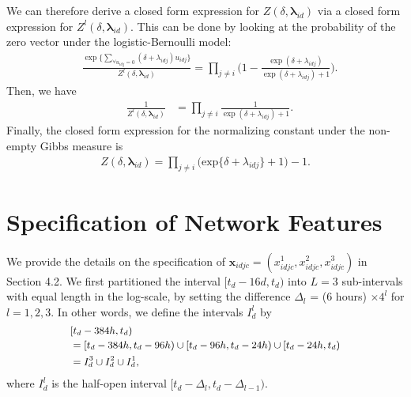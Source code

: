 \documentclass{article}
\begin{document}
 	 We can therefore derive a closed form expression for $Z(\delta,\boldsymbol{\lambda}_{id})$ via a closed form expression for $Z^{l}(\delta,\boldsymbol{\lambda}_{id})$. This can be done by looking at the probability of the zero vector under the logistic-Bernoulli model:
 	 \begin{equation*}
 	 	\begin{aligned}
 	 		&\frac{\exp\Big\{ \sum\limits_{\forall u_{idj}=0}(\delta+\lambda_{idj})u_{idj} \Big\}}{Z^{l}(\delta,\boldsymbol{\lambda}_{id})}= \prod_{j \neq i}   \Big(1-\frac{ \exp{(\delta+\lambda_{idj})}}{\exp{(\delta+\lambda_{idj})} + 1}\Big).
 	 	\end{aligned}  
 	 \end{equation*}
 	 Then, we have 
 	 \begin{equation*}
 	 	\begin{aligned}
 	 		& \frac{1}{Z^{l}(\delta,\boldsymbol{\lambda}_{id})} &= \prod\limits_{j \neq i}\frac{1}{ \exp(\delta+\lambda_{idj})+ 1}.
 	 	\end{aligned}  
 	 \end{equation*}
 	 Finally, the closed form expression for the normalizing constant under the non-empty Gibbs measure is  \begin{equation*}
 	 	\begin{aligned}Z(\delta,\boldsymbol{\lambda}_{id}) = \prod_{j \neq i } \big(\mbox{exp}\{\delta+\lambda_{idj}\} + 1\big)-1.
 	 	\end{aligned}  
 	 \end{equation*}

 \section{Specification of Network Features}\label{sec:Specification of Network Features}
We provide the details on the specification of $\boldsymbol{x}_{idjc} = ({x}^1_{idjc}, {x}^2_{idjc}, {x}^3_{idjc})$ in Section 4.2. We first partitioned the interval $[t_d-16d, t_d)$ into $L=3$ sub-intervals with equal length in the log-scale, by setting the difference $\Delta_l$ = (6 hours) $\times  4^l$ for $l=1,2,3$. In other words, we define the intervals $I_d^l$ by 
 \begin{equation*}
 \footnotesize
 \begin{aligned}
 &[t_d-384h,t_d) \\&=[t_d-384h, t_d-96h) \cup [t_d-96h, t_d-24h)\cup [t_d-24h, t_d)
 \\&=I_d^{3}\cup  I_d^{2}\cup I_d^{1},
 \end{aligned}
 \end{equation*}
 where $I_{d}^{l} $ is the half-open interval $[t_d-\Delta_l, t_d-\Delta_{l-1})$. 
 
\end{document}
